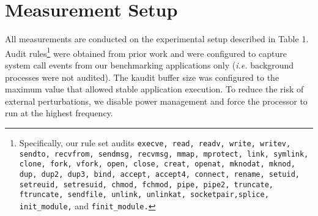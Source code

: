\section{Measurement Setup}

All measurements are conducted on the experimental setup described in Table 1. Audit rules\footnote{\label{foot:audit_rules}\scriptsize Specifically, our rule set audits {\tt execve, read, readv, write, writev, sendto, recvfrom, sendmsg, recvmsg, mmap, mprotect, link, symlink, clone, fork, vfork, open, close, creat, openat, mknodat, mknod, dup, dup2, dup3, bind, accept, accept4, connect, rename, setuid, setreuid, setresuid, chmod, fchmod, pipe, pipe2, truncate, ftruncate, sendfile, unlink,  unlinkat, socketpair,splice, init\_module,} and {\tt finit\_module.}} were obtained from prior work \cite{Liu2018,Hassan2019,Gehani2012,Ma2017,Paccagnella2020,Tang2018,Xu2016} and were configured to capture system call events from our benchmarking applications only (\textit{i.e.} background processes were not audited). The kaudit buffer size was configured to the maximum value that allowed stable application execution. To reduce the risk of external perturbations, we disable power management and force the processor to run at the highest frequency. 
\begin{table}[t]%
    \centering%
    \caption{Evaluation Platform}%
    \label{tab:eval_setup}%
    \end{table}%

